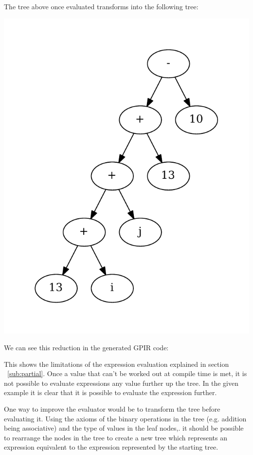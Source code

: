 The tree above once evaluated transforms into the following tree: 

\begin{center}
\includegraphics[scale=0.5]{graphs/futureTree.pdf}
\end{center}

We can see this reduction in the generated GPIR code:



This shows the limitations of the expression evaluation explained in section ~\ref{sub:partial}.
Once a value that can't be worked out at compile time is met, it is not possible
to evaluate expressions any value further up the tree. In the given example
it is clear that it is possible to evaluate the expression further.

One way to improve the evaluator would be to transform the tree before evaluating it.
Using the axioms of the binary operations in the tree (e.g. addition being associative)
and the type of values in the leaf nodes,. it should be possible to rearrange the nodes in the 
tree to create a new tree which represents an expression equivalent to the expression
represented by the starting tree.

